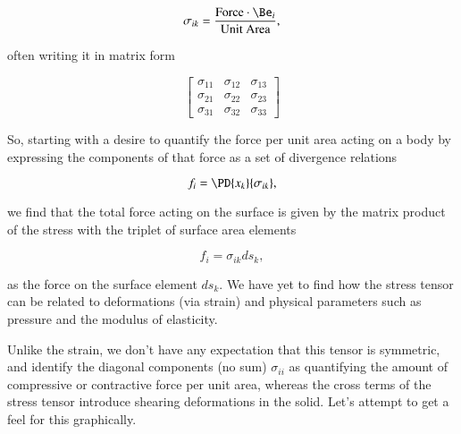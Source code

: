 \begin{equation}\label{eqn:continuumL3:310}
\sigma_{ik} = \frac{\text{Force} \cdot \Be_i}{\text{Unit Area}},
\end{equation}

often writing it in matrix form

\begin{equation}\label{eqn:continuumL3:350}
\begin{bmatrix}
\sigma_{11} & \sigma_{12} & \sigma_{13} \\
\sigma_{21} & \sigma_{22} & \sigma_{23} \\
\sigma_{31} & \sigma_{32} & \sigma_{33}
\end{bmatrix}
\end{equation}

So, starting with a desire to quantify the force per unit area acting on a body by expressing the components of that force as a set of divergence relations

\begin{equation}\label{eqn:continuumElasticityReview:250}
f_i = \PD{x_k}{\sigma_{i k}},
\end{equation}

we find that the total force acting on the surface is given by the matrix product of the stress with the triplet of surface area elements

\begin{equation}\label{eqn:continuumL3:330}
f_i = \sigma_{ik} ds_k,
\end{equation}

as the force on the surface element $ds_k$.   We have yet to find how the stress tensor can be related to deformations (via strain) and physical parameters such as pressure and the modulus of elasticity.  

Unlike the strain, we don't have any expectation that this tensor is symmetric, and identify the diagonal components (no sum) $\sigma_{i i}$ as quantifying the amount of compressive or contractive force per unit area, whereas the cross terms of the stress tensor introduce shearing deformations in the solid.  Let's attempt to get a feel for this graphically.

%

